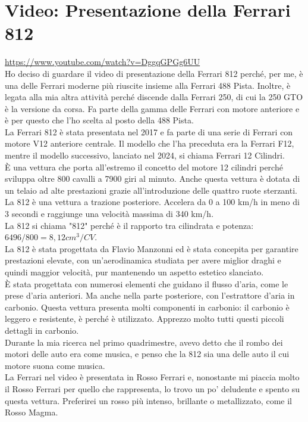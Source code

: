 \documentclass[12pt]{article}
\begin{document}
\section*{Video: Presentazione della Ferrari 812}
\url{https://www.youtube.com/watch?v=DggqGPGg6UU}\\
Ho deciso di guardare il video di presentazione della Ferrari 812 perché, per me, è una delle Ferrari moderne più riuscite insieme alla Ferrari 488 Pista. Inoltre, è legata alla mia altra attività perché discende dalla Ferrari 250, di cui la 250 GTO è la versione da corsa. Fa parte della gamma delle Ferrari con motore anteriore e è per questo che l'ho scelta al posto della 488 Pista.\\ 
La Ferrari 812 è stata presentata nel 2017 e fa parte di una serie di Ferrari con motore V12 anteriore centrale. Il modello che l'ha preceduta era la Ferrari F12, mentre il modello successivo, lanciato nel 2024, si chiama Ferrari 12 Cilindri.\\
È una vettura che porta all'estremo il concetto del motore 12 cilindri perché sviluppa oltre 800 cavalli a 7900 giri al minuto. Anche questa vettura è dotata di un telaio ad alte prestazioni grazie all'introduzione delle quattro ruote sterzanti. La 812 è una vettura a trazione posteriore. Accelera da 0 a 100 km/h in meno di 3 secondi e raggiunge una velocità massima di 340 km/h.\\
La 812 si chiama "812" perché  è il rapporto tra cilindrata e potenza: $6 496/800 = 8,12 cm^3/CV$.\\
La 812 è stata progettata da Flavio Manzonni ed è stata concepita per garantire prestazioni elevate, con un'aerodinamica studiata per avere miglior draghi e quindi maggior velocità, pur mantenendo un aspetto estetico slanciato.\\ 
È stata progettata con numerosi elementi che guidano il flusso d'aria, come le prese d'aria anteriori. Ma anche nella parte posteriore, con l'estrattore d'aria in carbonio. Questa vettura presenta molti componenti in carbonio: il carbonio è leggero e resistente, è perché è utilizzato. Apprezzo molto tutti questi piccoli dettagli in carbonio.\\
Durante la mia ricerca nel primo quadrimestre, avevo detto che il rombo dei motori delle auto era come musica, e penso che la 812 sia una delle auto il cui motore suona come musica.\\
La Ferrari nel video è presentata in Rosso Ferrari e, nonostante mi piaccia molto il Rosso Ferrari per quello che rappresenta, lo trovo un po’ deludente e spento su questa vettura. Preferirei un rosso più intenso, brillante o metallizzato, come il Rosso Magma. \\
\end{document}

